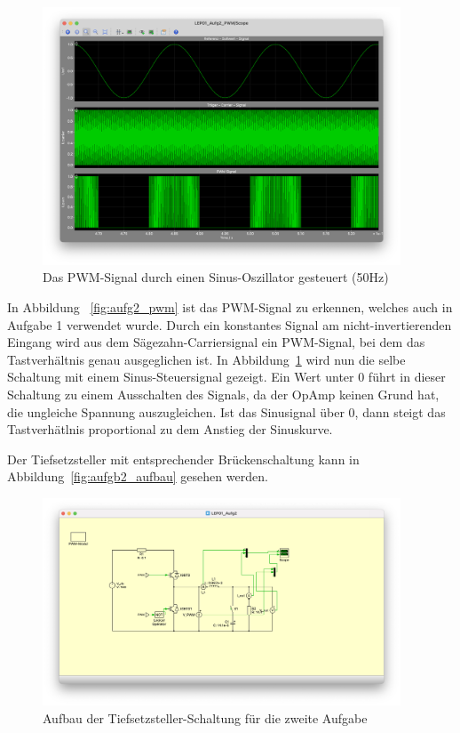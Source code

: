 \documentclass{report}
\begin{document}
\begin{figure}
  \begin{center}
    \includegraphics[width=0.95\textwidth]{assets/img/aufg2_pwm_sin.png}
  \end{center}
  \caption{Das PWM-Signal durch einen Sinus-Oszillator gesteuert (50Hz)}
  \label{fig:aufg2_pwm_sin}
\end{figure}

In Abbildung ~\ref{fig:aufg2_pwm} ist das PWM-Signal zu erkennen, welches auch in Aufgabe 1 verwendet wurde. Durch ein konstantes Signal am nicht-invertierenden Eingang wird aus dem Sägezahn-Carriersignal ein PWM-Signal, bei dem das Tastverhältnis genau ausgeglichen ist.
In Abbildung~\ref{fig:aufg2_pwm_sin} wird nun die selbe Schaltung mit einem Sinus-Steuersignal gezeigt. Ein Wert unter 0 führt in dieser Schaltung zu einem Ausschalten des Signals, da der OpAmp keinen Grund hat, die ungleiche Spannung auszugleichen. Ist das Sinusignal über 0, dann steigt das Tastverhätlnis proportional zu dem Anstieg der Sinuskurve. 

Der Tiefsetzsteller mit entsprechender Brückenschaltung kann in Abbildung~\ref{fig:aufgb2_aufbau} gesehen werden.

\begin{figure}
  \begin{center}
    \includegraphics[width=0.95\textwidth]{assets/img/aufg2_aufbau.png}
  \end{center}
  \caption{Aufbau der Tiefsetzsteller-Schaltung für die zweite Aufgabe}
  \label{fig:aufg2_aufbau}
\end{figure}
\end{document}
